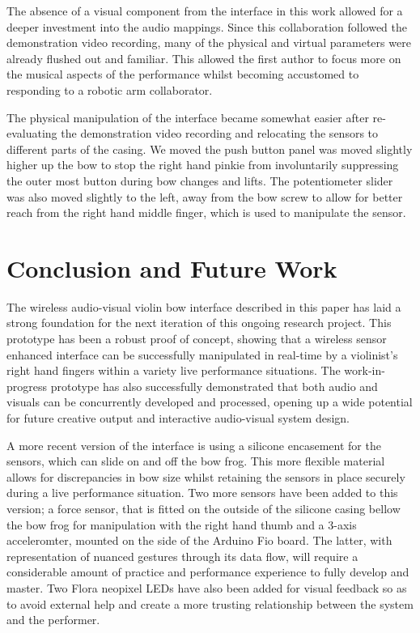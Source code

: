 \documentclass{nime-alternate}
\begin{document}
The absence of a visual component from the interface in this work allowed for a deeper investment into the audio mappings. Since this collaboration followed the demonstration video recording, many of the physical and virtual parameters were already flushed out and familiar. This allowed the first author to focus more on the musical aspects of the performance whilst becoming accustomed to responding to a robotic arm collaborator. 

The physical manipulation of the interface became somewhat easier after re-evaluating the demonstration video recording and relocating the sensors to different parts of the casing. We moved the push button panel was moved slightly higher up the bow to stop the right hand pinkie from involuntarily suppressing the outer most button during bow changes and lifts. The potentiometer slider was also moved slightly to the left, away from the bow screw to allow for better reach from the right hand middle finger, which is used to manipulate the sensor.

\section{Conclusion and Future Work}
The wireless audio-visual violin bow interface described in this paper has laid a strong foundation for the next iteration of this ongoing research project. This prototype has been a robust proof of concept, showing that a wireless sensor enhanced interface can be successfully manipulated in real-time by a violinist's right hand fingers within a variety live performance situations. The work-in-progress prototype has also successfully demonstrated that both audio and visuals can be concurrently developed and processed, opening up a wide potential for future creative output and interactive audio-visual system design.

A more recent version of the interface is using a silicone encasement for the sensors, which can slide on and off the bow frog. This more flexible material allows for discrepancies in bow size whilst retaining the sensors in place securely during a live performance situation. Two more sensors have been added to this version; a force sensor, that is fitted on the outside of the silicone casing bellow the bow frog for manipulation with the right hand thumb and a 3-axis acceleromter, mounted on the side of the Arduino Fio board. The latter, with representation of nuanced gestures through its data flow, will require a considerable amount of practice and performance experience to fully develop and master. Two Flora neopixel LEDs have also been added for visual feedback so as to avoid external help and create a more trusting relationship between the system and the performer\cite{kimura:creative}.
\end{document}
